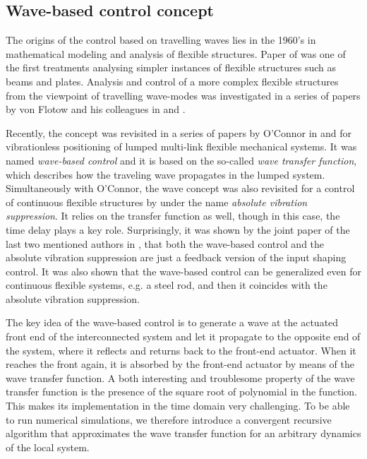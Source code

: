 \documentclass[final,5p,times,twocolumn]{elsarticle}
\begin{document}
\subsection{Wave-based control concept}
The origins of the control based on travelling waves lies in the 1960's in mathematical modeling and analysis of flexible structures. Paper of \cite{vaughan_application_1968} was one of the first treatments analysing simpler instances of flexible structures such as beams and plates. Analysis and control of a more complex flexible structures from the viewpoint of travelling wave-modes was investigated in a series of papers by von Flotow and his colleagues in \cite{Flotow1985} and \cite{Flotow1986}.

Recently, the concept was revisited in a series of papers by O'Connor in \cite{OConnor2006} and \cite{OConnor2007} for vibrationless positioning of lumped multi-link flexible mechanical systems. It was named \emph{wave-based control} and it is based on the so-called \emph{wave transfer function}, which describes how the traveling wave propagates in the lumped system. Simultaneously with O'Connor, the wave concept was also revisited for a control of continuous flexible structures by \cite{Halevi2005} under the name \emph{absolute vibration suppression}. It relies on the transfer function as well, though in this case, the time delay plays a key role. Surprisingly, it was shown by the joint paper of the last two mentioned authors in \cite{Peled2012}, that both the wave-based control and the absolute vibration suppression are just a feedback version of the input shaping control. It was also shown that the wave-based control can be generalized even for continuous flexible systems, e.g. a steel rod, and then it coincides with the absolute vibration suppression.

The key idea of the wave-based control is to generate a wave at the actuated front end of the interconnected system and let it propagate to the opposite end of the system, where it reflects and returns back to the front-end actuator. When it reaches the front again, it is absorbed by the front-end actuator by means of the wave transfer function. A both interesting and troublesome property of the wave transfer function is the presence of the square root of polynomial in the function. This makes its implementation in the time domain very challenging. To be able to run numerical simulations, we therefore introduce a convergent recursive algorithm that approximates the wave transfer function for an arbitrary dynamics of the local system.
\end{document}
